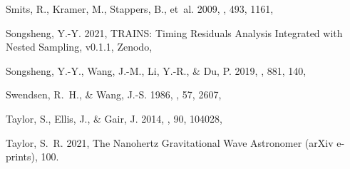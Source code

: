 \documentclass[times,tight]{aastex631}
\begin{document}
\begin{thebibliography}{}
{Smits}, R., {Kramer}, M., {Stappers}, B., {et~al.} 2009, \aap, 493, 1161,

{Songsheng}, Y.-Y. 2021, {TRAINS: Timing Residuals Analysis Integrated with
  Nested Sampling}, v0.1.1,  Zenodo, 

{Songsheng}, Y.-Y., {Wang}, J.-M., {Li}, Y.-R., \& {Du}, P. 2019, \apj, 881,
  140, 

{Swendsen}, R.~H., \& {Wang}, J.-S. 1986, \prl, 57, 2607,

{Taylor}, S., {Ellis}, J., \& {Gair}, J. 2014, \prd, 90, 104028,

{Taylor}, S.~R. 2021, {The Nanohertz Gravitational Wave Astronomer} (arXiv
  e-prints), 100.
\newblock {}


\end{thebibliography}
\end{document}
